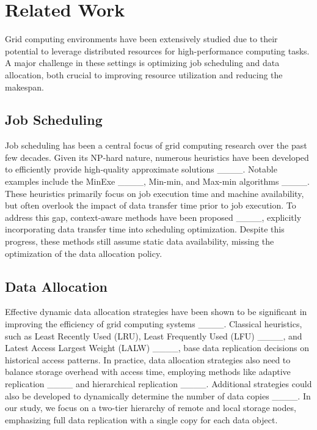 \section{Related Work}
Grid computing environments have been extensively studied due to their potential to leverage distributed resources for high-performance computing tasks. A major challenge in these settings is optimizing job scheduling and data allocation, both crucial to improving resource utilization and reducing the makespan.

\subsection{Job Scheduling}
Job scheduling has been a central focus of grid computing research over the past few decades. Given its NP-hard nature, numerous heuristics have been developed to efficiently provide high-quality approximate solutions ____. Notable examples include the MinExe ____, Min-min, and Max-min algorithms ____.  These heuristics primarily focus on job execution time and machine availability, but often overlook the impact of data transfer time prior to job execution. To address this gap, context-aware methods have been proposed ____, explicitly incorporating data transfer time into scheduling optimization. Despite this progress, these methods still assume static data availability, missing the optimization of the data allocation policy.

\subsection{Data Allocation}
Effective dynamic data allocation strategies have been shown to be significant in improving the efficiency of grid computing systems ____. Classical heuristics, such as Least Recently Used (LRU), Least Frequently Used (LFU) ____, and Latest Access Largest Weight (LALW) ____, base data replication decisions on historical access patterns. In practice, data allocation strategies also need to balance storage overhead with access time, employing methods like adaptive replication ____ and hierarchical replication ____. Additional strategies could also be developed to dynamically determine the number of data copies ____. In our study, we focus on a two-tier hierarchy of remote and local storage nodes, emphasizing full data replication with a single copy for each data object.


